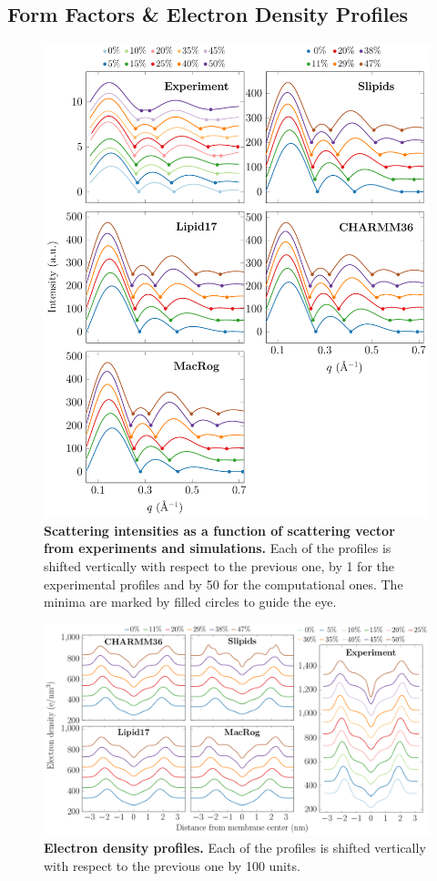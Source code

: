 \documentclass[journal=jpcbfk]{achemso}
\begin{document}
\clearpage

\subsection{Form Factors \& Electron Density Profiles}

\begin{figure}[htb!]
    \centering
    \includegraphics[width=0.86\linewidth]{../FIGS/scattering.pdf}
    \caption{\label{SIfig:scattering}%
     \textbf{Scattering intensities as a function of scattering vector from experiments and simulations.} Each of the profiles is shifted vertically with respect to the previous one, by 1 for the experimental profiles and by 50 for the computational ones. The minima are marked by filled circles to guide the eye.
    }
\end{figure}

\begin{figure}[htb!]
    \centering
    \includegraphics[width=\linewidth]{../FIGS/densityprofiles.pdf}
    \caption{\label{SIfig:densprofs}%
    \textbf{Electron density profiles.}
    Each of the profiles is shifted vertically with respect to the previous one by 100 units.
    }
\end{figure}
\end{document}
